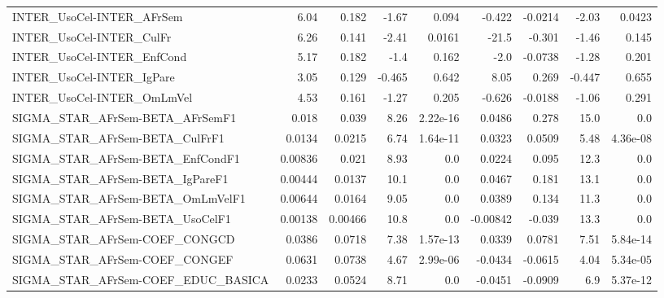 \begin{tabular}{lrrrrrrrr}
INTER\_UsoCel-INTER\_AFrSem             &        6.04 &        0.182 &   -1.67 &    0.094 &     -0.422 &     -0.0214 &        -2.03 &        0.0423 \\
INTER\_UsoCel-INTER\_CulFr              &        6.26 &        0.141 &   -2.41 &   0.0161 &      -21.5 &      -0.301 &        -1.46 &         0.145 \\
INTER\_UsoCel-INTER\_EnfCond            &        5.17 &        0.182 &    -1.4 &    0.162 &       -2.0 &     -0.0738 &        -1.28 &         0.201 \\
INTER\_UsoCel-INTER\_IgPare             &        3.05 &        0.129 &  -0.465 &    0.642 &       8.05 &       0.269 &       -0.447 &         0.655 \\
INTER\_UsoCel-INTER\_OmLmVel            &        4.53 &        0.161 &   -1.27 &    0.205 &     -0.626 &     -0.0188 &        -1.06 &         0.291 \\
SIGMA\_STAR\_AFrSem-BETA\_AFrSemF1       &       0.018 &        0.039 &    8.26 & 2.22e-16 &     0.0486 &       0.278 &         15.0 &           0.0 \\
SIGMA\_STAR\_AFrSem-BETA\_CulFrF1        &      0.0134 &       0.0215 &    6.74 & 1.64e-11 &     0.0323 &      0.0509 &         5.48 &      4.36e-08 \\
SIGMA\_STAR\_AFrSem-BETA\_EnfCondF1      &     0.00836 &        0.021 &    8.93 &      0.0 &     0.0224 &       0.095 &         12.3 &           0.0 \\
SIGMA\_STAR\_AFrSem-BETA\_IgPareF1       &     0.00444 &       0.0137 &    10.1 &      0.0 &     0.0467 &       0.181 &         13.1 &           0.0 \\
SIGMA\_STAR\_AFrSem-BETA\_OmLmVelF1      &     0.00644 &       0.0164 &    9.05 &      0.0 &     0.0389 &       0.134 &         11.3 &           0.0 \\
SIGMA\_STAR\_AFrSem-BETA\_UsoCelF1       &     0.00138 &      0.00466 &    10.8 &      0.0 &   -0.00842 &      -0.039 &         13.3 &           0.0 \\
SIGMA\_STAR\_AFrSem-COEF\_CONGCD         &      0.0386 &       0.0718 &    7.38 & 1.57e-13 &     0.0339 &      0.0781 &         7.51 &      5.84e-14 \\
SIGMA\_STAR\_AFrSem-COEF\_CONGEF         &      0.0631 &       0.0738 &    4.67 & 2.99e-06 &    -0.0434 &     -0.0615 &         4.04 &      5.34e-05 \\
SIGMA\_STAR\_AFrSem-COEF\_EDUC\_BASICA    &      0.0233 &       0.0524 &    8.71 &      0.0 &    -0.0451 &     -0.0909 &          6.9 &      5.37e-12 \\

\end{tabular}
